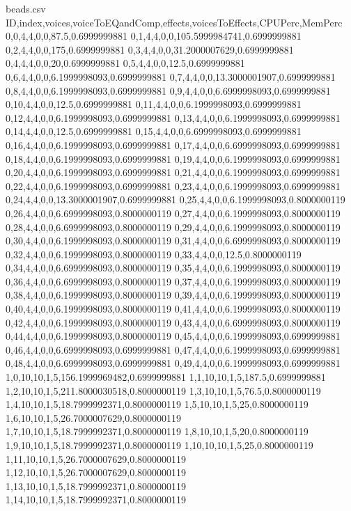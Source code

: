 \begin{filecontents*}{beads.csv}
ID,index,voices,voiceToEQandComp,effects,voicesToEffects,CPUPerc,MemPerc
0,0,4,4,0,0,87.5,0.6999999881
0,1,4,4,0,0,105.5999984741,0.6999999881
0,2,4,4,0,0,175,0.6999999881
0,3,4,4,0,0,31.2000007629,0.6999999881
0,4,4,4,0,0,20,0.6999999881
0,5,4,4,0,0,12.5,0.6999999881
0,6,4,4,0,0,6.1999998093,0.6999999881
0,7,4,4,0,0,13.3000001907,0.6999999881
0,8,4,4,0,0,6.1999998093,0.6999999881
0,9,4,4,0,0,6.6999998093,0.6999999881
0,10,4,4,0,0,12.5,0.6999999881
0,11,4,4,0,0,6.1999998093,0.6999999881
0,12,4,4,0,0,6.1999998093,0.6999999881
0,13,4,4,0,0,6.1999998093,0.6999999881
0,14,4,4,0,0,12.5,0.6999999881
0,15,4,4,0,0,6.6999998093,0.6999999881
0,16,4,4,0,0,6.1999998093,0.6999999881
0,17,4,4,0,0,6.6999998093,0.6999999881
0,18,4,4,0,0,6.1999998093,0.6999999881
0,19,4,4,0,0,6.1999998093,0.6999999881
0,20,4,4,0,0,6.1999998093,0.6999999881
0,21,4,4,0,0,6.1999998093,0.6999999881
0,22,4,4,0,0,6.1999998093,0.6999999881
0,23,4,4,0,0,6.1999998093,0.6999999881
0,24,4,4,0,0,13.3000001907,0.6999999881
0,25,4,4,0,0,6.1999998093,0.8000000119
0,26,4,4,0,0,6.6999998093,0.8000000119
0,27,4,4,0,0,6.1999998093,0.8000000119
0,28,4,4,0,0,6.6999998093,0.8000000119
0,29,4,4,0,0,6.1999998093,0.8000000119
0,30,4,4,0,0,6.1999998093,0.8000000119
0,31,4,4,0,0,6.6999998093,0.8000000119
0,32,4,4,0,0,6.1999998093,0.8000000119
0,33,4,4,0,0,12.5,0.8000000119
0,34,4,4,0,0,6.6999998093,0.8000000119
0,35,4,4,0,0,6.1999998093,0.8000000119
0,36,4,4,0,0,6.6999998093,0.8000000119
0,37,4,4,0,0,6.1999998093,0.8000000119
0,38,4,4,0,0,6.1999998093,0.8000000119
0,39,4,4,0,0,6.1999998093,0.8000000119
0,40,4,4,0,0,6.1999998093,0.8000000119
0,41,4,4,0,0,6.1999998093,0.8000000119
0,42,4,4,0,0,6.1999998093,0.8000000119
0,43,4,4,0,0,6.6999998093,0.8000000119
0,44,4,4,0,0,6.1999998093,0.8000000119
0,45,4,4,0,0,6.1999998093,0.6999999881
0,46,4,4,0,0,6.6999998093,0.6999999881
0,47,4,4,0,0,6.1999998093,0.6999999881
0,48,4,4,0,0,6.6999998093,0.6999999881
0,49,4,4,0,0,6.1999998093,0.6999999881
1,0,10,10,1,5,156.1999969482,0.6999999881
1,1,10,10,1,5,187.5,0.6999999881
1,2,10,10,1,5,211.8000030518,0.8000000119
1,3,10,10,1,5,76.5,0.8000000119
1,4,10,10,1,5,18.7999992371,0.8000000119
1,5,10,10,1,5,25,0.8000000119
1,6,10,10,1,5,26.7000007629,0.8000000119
1,7,10,10,1,5,18.7999992371,0.8000000119
1,8,10,10,1,5,20,0.8000000119
1,9,10,10,1,5,18.7999992371,0.8000000119
1,10,10,10,1,5,25,0.8000000119
1,11,10,10,1,5,26.7000007629,0.8000000119
1,12,10,10,1,5,26.7000007629,0.8000000119
1,13,10,10,1,5,18.7999992371,0.8000000119
1,14,10,10,1,5,18.7999992371,0.8000000119

\end{filecontents*}
